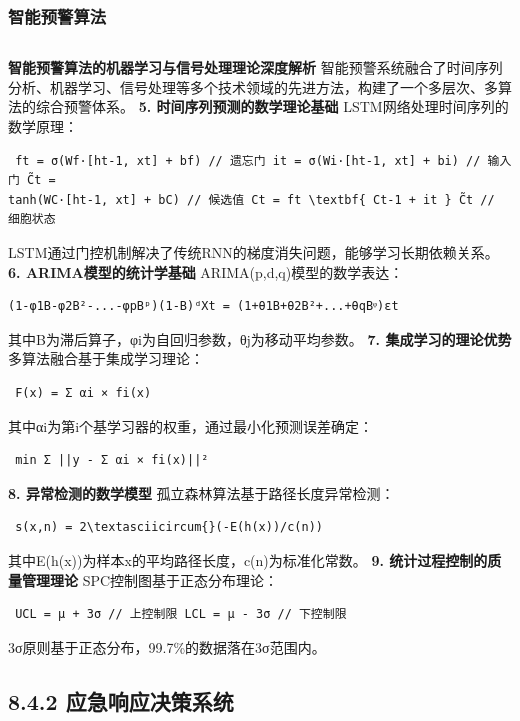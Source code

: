 \subsubsection{智能预警算法}\label{ux667aux80fdux9884ux8b66ux7b97ux6cd5} \begin{lstlisting}[language=Python] \end{lstlisting}
\textbf{智能预警算法的机器学习与信号处理理论深度解析} 智能预警系统融合了时间序列分析、机器学习、信号处理等多个技术领域的先进方法，构建了一个多层次、多算法的综合预警体系。 \textbf{5. 时间序列预测的数学理论基础}
LSTM网络处理时间序列的数学原理： \begin{lstlisting} ft = σ(Wf·[ht-1, xt] + bf) // 遗忘门 it = σ(Wi·[ht-1, xt] + bi) // 输入门 C̃t =
tanh(WC·[ht-1, xt] + bC) // 候选值 Ct = ft \textbf{ Ct-1 + it } C̃t // 细胞状态 \end{lstlisting}
LSTM通过门控机制解决了传统RNN的梯度消失问题，能够学习长期依赖关系。 \textbf{6. ARIMA模型的统计学基础} ARIMA(p,d,q)模型的数学表达： \begin{lstlisting}
(1-φ1B-φ2B²-...-φpBᵖ)(1-B)ᵈXt = (1+θ1B+θ2B²+...+θqBᵠ)εt \end{lstlisting} 其中B为滞后算子，φi为自回归参数，θj为移动平均参数。 \textbf{7.
集成学习的理论优势} 多算法融合基于集成学习理论： \begin{lstlisting} F(x) = Σ αi × fi(x) \end{lstlisting} 其中αi为第i个基学习器的权重，通过最小化预测误差确定：
\begin{lstlisting} min Σ ||y - Σ αi × fi(x)||² \end{lstlisting} \textbf{8. 异常检测的数学模型} 孤立森林算法基于路径长度异常检测：
\begin{lstlisting} s(x,n) = 2\textasciicircum{}(-E(h(x))/c(n)) \end{lstlisting} 其中E(h(x))为样本x的平均路径长度，c(n)为标准化常数。
\textbf{9. 统计过程控制的质量管理理论} SPC控制图基于正态分布理论： \begin{lstlisting} UCL = μ + 3σ // 上控制限 LCL = μ - 3σ // 下控制限 \end{lstlisting}
3σ原则基于正态分布，99.7\%的数据落在3σ范围内。 \subsection{8.4.2 应急响应决策系统}\label{ux5e94ux6025ux54cdux5e94ux51b3ux7b56ux7cfbux7edf}
